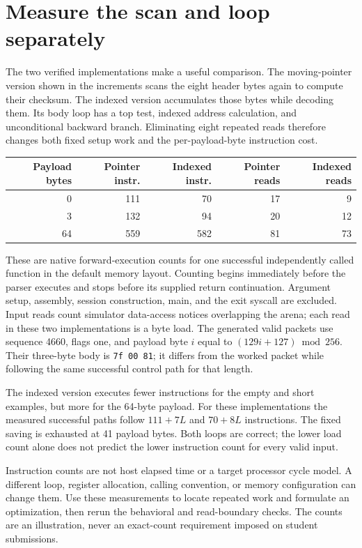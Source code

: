 \section{Measure the scan and loop separately}\label{packet-measurement}
The two verified implementations make a useful comparison. The moving-pointer
version shown in the increments scans the eight header bytes again to compute
their checksum. The indexed version accumulates those bytes while decoding them.
Its body loop has a top test, indexed address calculation, and unconditional
backward branch. Eliminating eight repeated reads therefore changes both fixed
setup work and the per-payload-byte instruction cost.

\begin{longtable}{rrrrr}
  \toprule
  Payload bytes & Pointer instr. & Indexed instr. & Pointer reads & Indexed reads \\\midrule
  0             & 111            & 70             & 17            & 9             \\
  3             & 132            & 94             & 20            & 12            \\
  64            & 559            & 582            & 81            & 73            \\\bottomrule
\end{longtable}
These are native forward-execution counts for one successful independently called
function in the default memory layout. Counting begins immediately before the
parser executes and stops before its supplied return continuation. Argument setup,
assembly, session construction, main, and the exit syscall are excluded. Input
reads count simulator data-access notices overlapping the arena; each read in these
two implementations is a byte load. The generated valid packets use sequence 4660, flags one, and payload
byte \(i\) equal to \((129i+127)\bmod256\). Their three-byte body is
\texttt{7f 00 81}; it differs from the worked packet while following the same
successful control path for that length.

The indexed version executes fewer instructions for the empty and short examples,
but more for the 64-byte payload. For these implementations the measured successful
paths follow \(111+7L\) and \(70+8L\) instructions. The fixed saving is exhausted
at 41 payload bytes. Both loops are correct; the lower load count alone does not
predict the lower instruction count for every valid input.

Instruction counts are not host elapsed time or a target processor cycle model.
A different loop, register allocation, calling convention, or memory configuration
can change them. Use these measurements to locate repeated work and formulate an
optimization, then rerun the behavioral and read-boundary checks. The counts are
an illustration, never an exact-count requirement imposed on student submissions.
